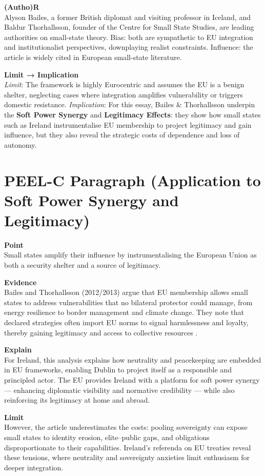 \textbf{(Autho)R} \\
Alyson Bailes, a former British diplomat and visiting professor in Iceland, and Baldur Thorhallsson, founder of the Centre for Small State Studies, are leading authorities on small-state theory. Bias: both are sympathetic to EU integration and institutionalist perspectives, downplaying realist constraints. Influence: the article is widely cited in European small-state literature.  

\textbf{Limit → Implication} \\
\textit{Limit}: The framework is highly Eurocentric and assumes the EU is a benign shelter, neglecting cases where integration amplifies vulnerability or triggers domestic resistance.  
\textit{Implication}: For this essay, Bailes \& Thorhallsson underpin the \textbf{Soft Power Synergy} and \textbf{Legitimacy Effects}: they show how small states such as Ireland instrumentalise EU membership to project legitimacy and gain influence, but they also reveal the strategic costs of dependence and loss of autonomy.

\section*{PEEL-C Paragraph (Application to Soft Power Synergy and Legitimacy)}

\textbf{Point} \\
Small states amplify their influence by instrumentalising the European Union as both a security shelter and a source of legitimacy.  

\textbf{Evidence} \\
Bailes and Thorhallsson (2012/2013) argue that EU membership allows small states to address vulnerabilities that no bilateral protector could manage, from energy resilience to border management and climate change. They note that declared strategies often import EU norms to signal harmlessness and loyalty, thereby gaining legitimacy and access to collective resources \parencite{BAILES_2012}.  

\textbf{Explain} \\
For Ireland, this analysis explains how neutrality and peacekeeping are embedded in EU frameworks, enabling Dublin to project itself as a responsible and principled actor. The EU provides Ireland with a platform for soft power synergy — enhancing diplomatic visibility and normative credibility — while also reinforcing its legitimacy at home and abroad.  

\textbf{Limit} \\
However, the article underestimates the costs: pooling sovereignty can expose small states to identity erosion, elite–public gaps, and obligations disproportionate to their capabilities. Ireland’s referenda on EU treaties reveal these tensions, where neutrality and sovereignty anxieties limit enthusiasm for deeper integration.  

